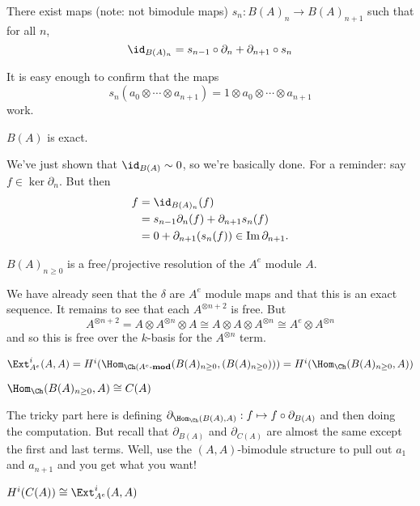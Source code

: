 \documentclass[12pt]{article}
\begin{document}
\begin{thm}
	There exist maps (note: not bimodule maps) $s_n:B(A)_n\to B(A)_{n+1}$ such that for all $n$,
	\[\id_{B(A)_n}=s_{n-1}\circ\partial_n+\partial_{n+1}\circ s_n\]
\end{thm}
\begin{prf}
	It is easy enough to confirm that the maps
	\[s_n(a_0\otimes\cdots\otimes a_{n+1})=1\otimes a_0\otimes \cdots\otimes a_{n+1}\]
	work.
\end{prf}
\begin{lem}
	$B(A)$ is exact.
\end{lem}
\begin{rmk}
	We've just shown that $\id_{B(A)}\sim 0$, so we're basically done. For a reminder: say $f\in \ker\partial_n$. 
	But then 
	\begin{align*}
		f&=\id_{B(A)_n}(f)\\
		&= s_{n-1}\partial_n(f)+\partial_{n+1}s_n(f)\\
		&= 0 + \partial_{n+1}(s_n(f))\in\operatorname{Im}\partial_{n+1}.
	\end{align*}
\end{rmk}
\begin{thm}
	$B(A)_{n\ge 0}$ is a free/projective resolution of the $A^e$ module $A$.
\end{thm}
\begin{prf}
	We have already seen that the $\delta$ are $A^e$ module maps and that this is an exact sequence.
	It remains to see that each $A^{\otimes n+2}$ is free. But
	\[A^{\otimes n+2}=A\otimes A^{\otimes n}\otimes A\cong A\otimes A\otimes A^{\otimes n}\cong A^e\otimes A^{\otimes n}\]
	and so this is free over the $k$-basis for the $A^{\otimes n}$ term.
\end{prf}

\begin{cor}
	$\Ext_{A^e}^i(A,A)=H^i(\Hom_{\Ch(A^e\text{-}\mathbf{mod}}(B(A)_{n\ge 0},(B(A)_{n\ge 0})))=H^i(\Hom_{\Ch}(B(A)_{n\ge 0},A))$
\end{cor}
\begin{thm}
	$\Hom_{\Ch}(B(A)_{n\ge 0},A)\cong C(A)$
\end{thm}
\begin{prf}
	The tricky part here is defining $\partial_{\Hom_{\Ch}(B(A),A)}:f\mapsto f\circ\partial_{B(A)}$ and then doing the computation. But recall that
	$\partial_{B(A)}$ and $\partial_{C(A)}$ are almost the same except the first and last terms. Well, use the
	$(A,A)$-bimodule structure to pull out $a_1$ and $a_{n+1}$ and you get what you want!
\end{prf}
\begin{cor}
	$H^i(C(A))\cong\Ext_{A^e}^i(A,A)$
\end{cor}
\end{document}
